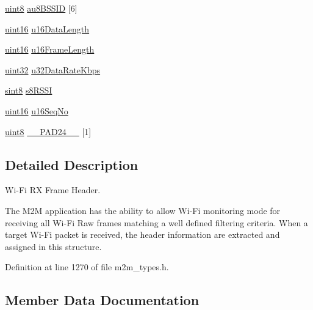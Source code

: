 \begin{DoxyCompactItemize}
\item 
\hyperlink{group__DataT_ga4df709a77647e870bbf1d955b8edc9a6}{uint8} \hyperlink{structtstrM2MWifiRxPacketInfo_a1cd96b319db2d997d96c11e427d120aa}{au8\+B\+S\+S\+ID} \mbox{[}6\mbox{]}
\item 
\hyperlink{group__DataT_ga1daa745171fc6e31d942c161422a76f9}{uint16} \hyperlink{structtstrM2MWifiRxPacketInfo_a711e67ae9ce398631fab65a0c614e973}{u16\+Data\+Length}
\item 
\hyperlink{group__DataT_ga1daa745171fc6e31d942c161422a76f9}{uint16} \hyperlink{structtstrM2MWifiRxPacketInfo_a01816d3404618e8d243ef51d961e2d46}{u16\+Frame\+Length}
\item 
\hyperlink{group__DataT_ga100e7c691a47d6978527c479a0158245}{uint32} \hyperlink{structtstrM2MWifiRxPacketInfo_a3cfb61dc19fed3258de01cec7d3966cc}{u32\+Data\+Rate\+Kbps}
\item 
\hyperlink{group__DataT_gae35f10ffd0ac8dd2bc3e794da9bdfbc7}{sint8} \hyperlink{structtstrM2MWifiRxPacketInfo_a03f628bb1ec1aa3ac2cef8f2085df055}{s8\+R\+S\+SI}
\item 
\hyperlink{group__DataT_ga1daa745171fc6e31d942c161422a76f9}{uint16} \hyperlink{structtstrM2MWifiRxPacketInfo_af7ad5dfb267d724417974c409dcde364}{u16\+Seq\+No}
\item 
\hyperlink{group__DataT_ga4df709a77647e870bbf1d955b8edc9a6}{uint8} \hyperlink{structtstrM2MWifiRxPacketInfo_ad03d350f4601e477bbca72a424ad5670}{\+\_\+\+\_\+\+P\+A\+D24\+\_\+\+\_\+} \mbox{[}1\mbox{]}
\end{DoxyCompactItemize}


\subsection{Detailed Description}
Wi-\/\+Fi RX Frame Header. 

The M2M application has the ability to allow Wi-\/\+Fi monitoring mode for receiving all Wi-\/\+Fi Raw frames matching a well defined filtering criteria. When a target Wi-\/\+Fi packet is received, the header information are extracted and assigned in this structure. 

Definition at line 1270 of file m2m\+\_\+types.\+h.



\subsection{Member Data Documentation}
\mbox{\label{structtstrM2MWifiRxPacketInfo_ad03d350f4601e477bbca72a424ad5670}} 
